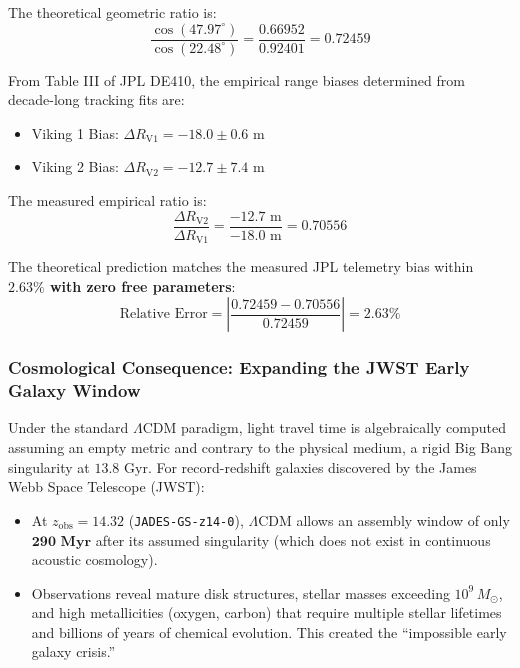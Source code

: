 \documentclass[11pt,a4paper]{article}
\begin{document}
The theoretical geometric ratio is:
\begin{equation}
\frac{\cos(47.97^\circ)}{\cos(22.48^\circ)} = \frac{0.66952}{0.92401} = \mathbf{0.72459}
\end{equation}

From Table III of JPL DE410, the empirical range biases determined from decade-long tracking fits are:
\begin{itemize}
    \item Viking 1 Bias: $\Delta R_{\text{V1}} = -18.0 \pm 0.6\text{ m}$
    \item Viking 2 Bias: $\Delta R_{\text{V2}} = -12.7 \pm 7.4\text{ m}$
\end{itemize}

The measured empirical ratio is:
\begin{equation}
\frac{\Delta R_{\text{V2}}}{\Delta R_{\text{V1}}} = \frac{-12.7\text{ m}}{-18.0\text{ m}} = \mathbf{0.70556}
\end{equation}

The theoretical prediction matches the measured JPL telemetry bias within \textbf{$2.63\%$ with zero free parameters}:
\begin{equation}
\text{Relative Error} = \left|\frac{0.72459 - 0.70556}{0.72459}\right| = \mathbf{2.63\%}
\end{equation}

\subsubsection{Cosmological Consequence: Expanding the JWST Early Galaxy Window}

Under the standard $\Lambda\text{CDM}$ paradigm, light travel time is algebraically computed assuming an empty metric and contrary to the physical medium, a rigid Big Bang singularity at $13.8\text{ Gyr}$. For record-redshift galaxies discovered by the James Webb Space Telescope (JWST):
\begin{itemize}
    \item At $z_{\text{obs}} = 14.32$ (\texttt{JADES-GS-z14-0}), $\Lambda\text{CDM}$ allows an assembly window of only $\mathbf{290\text{ Myr}}$ after its assumed singularity (which does not exist in continuous acoustic cosmology).
    \item Observations reveal mature disk structures, stellar masses exceeding $10^9\,M_\odot$, and high metallicities (oxygen, carbon) that require multiple stellar lifetimes and billions of years of chemical evolution. This created the ``impossible early galaxy crisis.''
\end{itemize}
\end{document}

